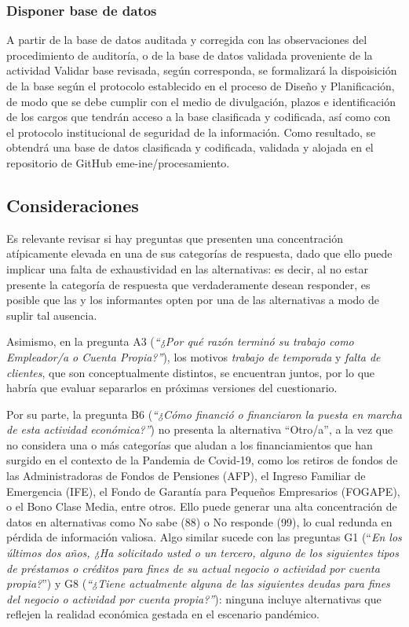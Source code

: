 \documentclass[
]{article}
\begin{document}
\hypertarget{disponer-base-de-datos}{%
\subsubsection{Disponer base de datos}\label{disponer-base-de-datos}}

A partir de la base de datos auditada y corregida con las observaciones del procedimiento de auditoría, o de la base de datos validada proveniente de la actividad Validar base revisada, según corresponda, se formalizará la dispoisición de la base según el protocolo establecido en el proceso de Diseño y Planificación, de modo que se debe cumplir con el medio de divulgación, plazos e identificación de los cargos que tendrán acceso a la base clasificada y codificada, así como con el protocolo institucional de seguridad de la información. Como resultado, se obtendrá una base de datos clasificada y codificada, validada y alojada en el repositorio de GitHub eme-ine/procesamiento.

\hypertarget{consideraciones}{%
\subsection{Consideraciones}\label{consideraciones}}

Es relevante revisar si hay preguntas que presenten una concentración atípicamente elevada en una de sus categorías de respuesta, dado que ello puede implicar una falta de exhaustividad en las alternativas: es decir, al no estar presente la categoría de respuesta que verdaderamente desean responder, es posible que las y los informantes opten por una de las alternativas a modo de suplir tal ausencia.

Asimismo, en la pregunta A3 (\emph{``¿Por qué razón terminó su trabajo como Empleador/a o Cuenta Propia?''}), los motivos \emph{trabajo de temporada} y \emph{falta de clientes}, que son conceptualmente distintos, se encuentran juntos, por lo que habría que evaluar separarlos en próximas versiones del cuestionario.

Por su parte, la pregunta B6 (\emph{``¿Cómo financió o financiaron la puesta en marcha de esta actividad económica?''}) no presenta la alternativa ``Otro/a'', a la vez que no considera una o más categorías que aludan a los financiamientos que han surgido en el contexto de la Pandemia de Covid-19, como los retiros de fondos de las Administradoras de Fondos de Pensiones (AFP), el Ingreso Familiar de Emergencia (IFE), el Fondo de Garantía para Pequeños Empresarios (FOGAPE), o el Bono Clase Media, entre otros. Ello puede generar una alta concentración de datos en alternativas como No sabe (88) o No responde (99), lo cual redunda en pérdida de información valiosa. Algo similar sucede con las preguntas G1 (``\emph{En los últimos dos años, ¿Ha solicitado usted o un tercero, alguno de los siguientes tipos de préstamos o créditos para fines de su actual negocio o actividad por cuenta propia?}'') y G8 (\emph{``¿Tiene actualmente alguna de las siguientes deudas para fines del negocio o actividad por cuenta propia?''}): ninguna incluye alternativas que reflejen la realidad económica gestada en el escenario pandémico.
\end{document}
